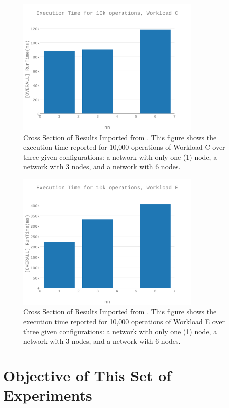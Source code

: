 \begin{figure}[h]
\includegraphics[width=3.5in]{Figures/figures-wlc_fig1.pdf}

\caption{Cross Section of Results Imported from \cite{Abramova2014}.  This figure shows the execution time reported for 10,000 operations of Workload C over three given configurations: a network with only one (1) node, a network with 3 nodes, and a network with 6 nodes.}

\label{fig:wlc_fig1}
\end{figure}

\begin{figure}[h]
\includegraphics[width=3.5in]{Figures/figures-wle_fig1.pdf}

\caption{Cross Section of Results Imported from \cite{Abramova2014}.  This figure shows the execution time reported for 10,000 operations of Workload E over three given configurations: a network with only one (1) node, a network with 3 nodes, and a network with 6 nodes.}

\label{fig:wle_fig1}
\end{figure}

\section{Objective of This Set of Experiments}

